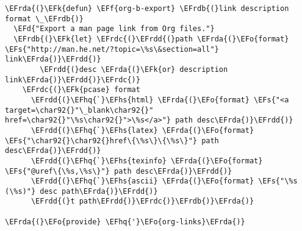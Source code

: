\documentclass[a4wide,10pt]{article}
\newcommand{\EFs}[1]{\textcolor{EFs}{#1}} %
\newcommand{\EFd}[1]{\textcolor{EFd}{#1}} %
\newcommand{\EFk}[1]{\textcolor{EFk}{#1}} %
\newcommand{\EFf}[1]{\textcolor{EFf}{#1}} %
\newcommand{\EFo}[1]{\textcolor{EFo}{#1}} %
\newcommand{\EFhq}[1]{\textcolor{EFhq}{#1}} %
\newcommand{\EFhs}[1]{\textcolor{EFhs}{#1}} %
\newcommand{\EFrda}[1]{\textcolor{EFrda}{#1}} %
\newcommand{\EFrdb}[1]{\textcolor{EFrdb}{#1}} %
\newcommand{\EFrdc}[1]{\textcolor{EFrdc}{#1}} %
\newcommand{\EFrdd}[1]{\textcolor{EFrdd}{#1}} %
\begin{document}
\begin{Code}
\begin{Verbatim}
\EFrda{(}\EFk{defun} \EFf{org-b-export} \EFrdb{(}link description format \_\EFrdb{)}
  \EFd{"Export a man page link from Org files."}
  \EFrdb{(}\EFk{let} \EFrdc{(}\EFrdd{(}path \EFrda{(}\EFo{format} \EFs{"http://man.he.net/?topic=\%s\&section=all"} link\EFrda{)}\EFrdd{)}
        \EFrdd{(}desc \EFrda{(}\EFk{or} description link\EFrda{)}\EFrdd{)}\EFrdc{)}
    \EFrdc{(}\EFk{pcase} format
      \EFrdd{(}\EFhq{`}\EFhs{html} \EFrda{(}\EFo{format} \EFs{"<a target=\char92{}"\_blank\char92{}" href=\char92{}"\%s\char92{}">\%s</a>"} path desc\EFrda{)}\EFrdd{)}
      \EFrdd{(}\EFhq{`}\EFhs{latex} \EFrda{(}\EFo{format} \EFs{"\char92{}\char92{}href\{\%s\}\{\%s\}"} path desc\EFrda{)}\EFrdd{)}
      \EFrdd{(}\EFhq{`}\EFhs{texinfo} \EFrda{(}\EFo{format} \EFs{"@uref\{\%s,\%s\}"} path desc\EFrda{)}\EFrdd{)}
      \EFrdd{(}\EFhq{`}\EFhs{ascii} \EFrda{(}\EFo{format} \EFs{"\%s (\%s)"} desc path\EFrda{)}\EFrdd{)}
      \EFrdd{(}t path\EFrdd{)}\EFrdc{)}\EFrdb{)}\EFrda{)}

\EFrda{(}\EFo{provide} \EFhq{'}\EFo{org-links}\EFrda{)}
\end{Verbatim}
\end{Code}
\end{document}
